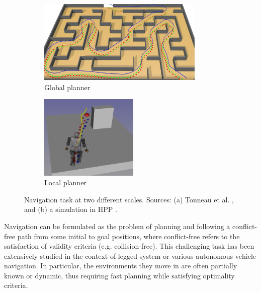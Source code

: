\begin{figure}[h]
    \centering
    \captionsetup[subfigure]{justification=centering}
    \begin{subfigure}[t]{0.40\linewidth}
    \includegraphics[width=\textwidth,height=4cm]{Figures/Chapter_SOTA//sl1m_maze.png}
    \caption{Global planner}
    \label{fig:nav_ex_0}
    \end{subfigure}
    \begin{subfigure}[t]{0.40\linewidth}
    \includegraphics[width=\textwidth,height=4cm,trim={2cm 2cm 2cm 0},clip]{Figures/Chapter_SOTA//local_planning_wall.png}
    \caption{Local planner}
    \label{fig:nav_ex_1}
    \end{subfigure}
    \caption{Navigation task at two different scales. Sources: (a) Tonneau et al. \cite{sl1m_v1}, and (b) a simulation in HPP \cite{HPP}.}
\end{figure}


Navigation can be formulated as the problem of planning and following a conflict-free path from some initial to goal positions, where conflict-free refers to the satisfaction of validity criteria (e.g. collision-free).
This challenging task has been extensively studied in the context of legged system or various autonomous vehicle navigation.
In particular, the environments they move in are often partially known or dynamic, thus requiring fast planning while satisfying optimality criteria.

